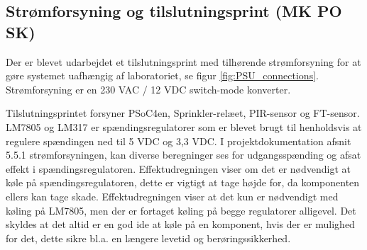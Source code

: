 \subsection{Strømforsyning og tilslutningsprint (MK PO SK)}

Der er blevet udarbejdet et tilslutningsprint med tilhørende strømforsyning for at gøre systemet uafhængig af laboratoriet, se figur \ref{fig:PSU_connections}. Strømforsyning er en 230 VAC / 12 VDC switch-mode konverter.


Tilslutningsprintet forsyner PSoC4en, Sprinkler-relæet, PIR-sensor og FT-sensor. LM7805 og LM317 er spændingsregulatorer som er blevet brugt til henholdsvis at regulere spændingen ned til 5 VDC og 3,3 VDC. I projektdokumentation afsnit 5.5.1 strømforsyningen, kan diverse beregninger ses for udgangsspænding og afsat effekt i spændingsregulatoren. Effektudregningen viser om det er nødvendigt at køle på spændingsregulatoren, dette er vigtigt at tage højde for, da komponenten ellers kan tage skade. Effektudregningen viser at det kun er nødvendigt med køling på LM7805, men der er fortaget køling på begge regulatorer alligevel. Det skyldes at det altid er en god ide at køle på en komponent, hvis der er mulighed for det, dette sikre bl.a. en længere levetid og berøringssikkerhed.

   